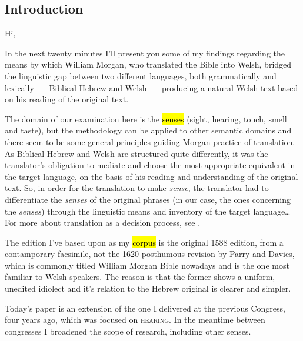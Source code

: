 \begin{paper}
	\section{Introduction}

	Hi,

	{\click} In the next twenty minutes I’ll present you some of my findings regarding the means by which William Morgan, who translated the Bible into Welsh, bridged the linguistic gap between two different languages, both grammatically and lexically~— Biblical Hebrew and Welsh~— producing a natural Welsh text based on his reading of the original text.

	The domain of our examination here is the \hl{senses} (sight, hearing, touch, smell and taste), but the methodology can be applied to other semantic domains and there seem to be some general principles guiding Morgan practice of translation. As Biblical Hebrew and Welsh are structured quite differently, it was the translator’s obligation to mediate and choose the most appropriate equivalent in the target language, on the basis of his reading and understanding of the original text. So, in order for the translation to make \emph{sense}, the translator had to differentiate the \emph{senses} of the original phrases (in our case, the ones concerning the \emph{senses}) through the linguistic means and inventory of the target language… For more about translation as a decision process, see \cite{levy.j:1967:translation}.

	{\click} The edition I’ve based upon as my \hl{corpus} is the original 1588 edition, from a contamporary facsimile, not the 1620 posthumous revision by Parry and Davies, which is commonly titled William Morgan Bible nowadays and is the one most familiar to Welsh speakers. The reason is that the former shows a uniform, unedited idiolect and it’s relation to the Hebrew original is clearer and simpler.

	{\click} Today’s paper is an extension of the one I delivered at the previous Congress, four years ago, which was focused on \textsc{hearing}. In the meantime between congresses I broadened the scope of research, including other senses.

\end{paper}
